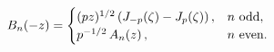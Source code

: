 \[\mathop{B_{n}\/}\nolimits\!\left(-z\right)=\begin{cases}(pz)^{1/2}\left(%
\mathop{J_{-p}\/}\nolimits\!\left(\zeta\right)-\mathop{J_{p}\/}\nolimits\!%
\left(\zeta\right)\right),&n\text{ odd},\\
p^{-1/2}\mathop{A_{n}\/}\nolimits\!\left(z\right),&n\text{ even}.\end{cases}\]